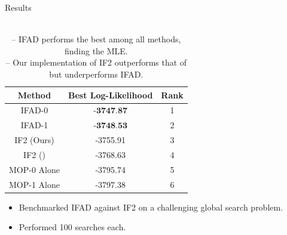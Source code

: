 \documentclass{beamer}
\begin{document}
\begin{frame}{Results}
    
    \begin{table}[h!]
        \centering
        \begin{tabular}{||c c c||} 
         \hline
         Method & Best Log-Likelihood & Rank \\ [0.5ex] 
         \hline\hline
         IFAD-0 & $\textbf{-3747.87}$ & 1\\
         IFAD-1 & $\textbf{-3748.53}$ & 2\\
         IF2 (Ours) & -3755.91 & 3\\
         IF2 (\cite{ionides15}) & -3768.63 & 4\\ 
         MOP-0 Alone & -3795.74 & 5\\
         MOP-1 Alone & -3797.38 & 6\\
         \hline
        \end{tabular}
        \caption{\\
        -- IFAD performs the best among all methods, finding the MLE. \\
        -- Our implementation of IF2 outperforms that of \cite{ionides15} but underperforms IFAD.}
        \label{table:mle}
    \end{table}
    
    \begin{itemize}
        \item Benchmarked IFAD against IF2 on a challenging global search problem. 
        \item \pause Performed 100 searches each. 
    \end{itemize}
    
\end{frame}
\end{document}
